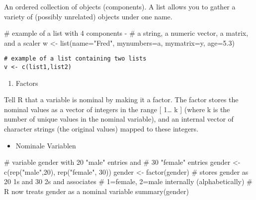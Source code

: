 \documentclass[]{article}
\newenvironment{Shaded}{\begin{snugshade}}{\end{snugshade}}
\newcommand{\KeywordTok}[1]{\textcolor[rgb]{0.94,0.87,0.69}{{#1}}}
\newcommand{\DataTypeTok}[1]{\textcolor[rgb]{0.87,0.87,0.75}{{#1}}}
\newcommand{\DecValTok}[1]{\textcolor[rgb]{0.86,0.86,0.80}{{#1}}}
\newcommand{\FloatTok}[1]{\textcolor[rgb]{0.75,0.75,0.82}{{#1}}}
\newcommand{\StringTok}[1]{\textcolor[rgb]{0.80,0.58,0.58}{{#1}}}
\newcommand{\CommentTok}[1]{\textcolor[rgb]{0.50,0.62,0.50}{{#1}}}
\newcommand{\NormalTok}[1]{\textcolor[rgb]{0.80,0.80,0.80}{{#1}}}
\begin{document}
An ordered collection of objects (components). A list allows you to
gather a variety of (possibly unrelated) objects under one name.

\begin{Shaded}
\begin{Highlighting}[]
\CommentTok{# example of a list with 4 components - }
\CommentTok{# a string, a numeric vector, a matrix, and a scaler }
\NormalTok{w <-}\StringTok{ }\KeywordTok{list}\NormalTok{(}\DataTypeTok{name=}\StringTok{"Fred"}\NormalTok{, }\DataTypeTok{mynumbers=}\NormalTok{a, }\DataTypeTok{mymatrix=}\NormalTok{y, }\DataTypeTok{age=}\FloatTok{5.3}\NormalTok{)}
\end{Highlighting}
\end{Shaded}

\begin{verbatim}
# example of a list containing two lists 
v <- c(list1,list2)
\end{verbatim}

\begin{enumerate}
\def\labelenumi{\arabic{enumi}.}
\setcounter{enumi}{5}
\itemsep1pt\parskip0pt
\item
  Factors
\end{enumerate}

Tell R that a variable is nominal by making it a factor. The factor
stores the nominal values as a vector of integers in the range {[}
1\ldots{} k {]} (where k is the number of unique values in the nominal
variable), and an internal vector of character strings (the original
values) mapped to these integers.

\begin{itemize}
\itemsep1pt\parskip0pt
\item
  Nominale Variablen
\end{itemize}

\begin{Shaded}
\begin{Highlighting}[]
\CommentTok{# variable gender with 20 "male" entries and }
\CommentTok{# 30 "female" entries }
\NormalTok{gender <-}\StringTok{ }\KeywordTok{c}\NormalTok{(}\KeywordTok{rep}\NormalTok{(}\StringTok{"male"}\NormalTok{,}\DecValTok{20}\NormalTok{), }\KeywordTok{rep}\NormalTok{(}\StringTok{"female"}\NormalTok{, }\DecValTok{30}\NormalTok{)) }
\NormalTok{gender <-}\StringTok{ }\KeywordTok{factor}\NormalTok{(gender) }
\CommentTok{# stores gender as 20 1s and 30 2s and associates}
\CommentTok{# 1=female, 2=male internally (alphabetically)}
\CommentTok{# R now treats gender as a nominal variable }
\KeywordTok{summary}\NormalTok{(gender)}
\end{Highlighting}
\end{Shaded}
\end{document}
